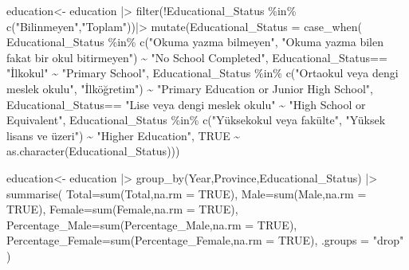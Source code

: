 \documentclass[
  11pt,
  a4paper,
  DIV=11,
  numbers=noendperiod]{scrartcl}
\newenvironment{Shaded}{\begin{snugshade}}{\end{snugshade}}
\newcommand{\AttributeTok}[1]{\textcolor[rgb]{0.40,0.45,0.13}{#1}}
\newcommand{\ConstantTok}[1]{\textcolor[rgb]{0.56,0.35,0.01}{#1}}
\newcommand{\FunctionTok}[1]{\textcolor[rgb]{0.28,0.35,0.67}{#1}}
\newcommand{\NormalTok}[1]{\textcolor[rgb]{0.00,0.23,0.31}{#1}}
\newcommand{\OtherTok}[1]{\textcolor[rgb]{0.00,0.23,0.31}{#1}}
\newcommand{\SpecialCharTok}[1]{\textcolor[rgb]{0.37,0.37,0.37}{#1}}
\newcommand{\StringTok}[1]{\textcolor[rgb]{0.13,0.47,0.30}{#1}}
\begin{document}
\begin{Shaded}
\begin{Highlighting}[]
\NormalTok{ education}\OtherTok{\textless{}{-}}\NormalTok{ education }\SpecialCharTok{|\textgreater{}} \FunctionTok{filter}\NormalTok{(}\SpecialCharTok{!}\NormalTok{Educational\_Status }\SpecialCharTok{\%in\%} \FunctionTok{c}\NormalTok{(}\StringTok{"Bilinmeyen"}\NormalTok{,}\StringTok{"Toplam"}\NormalTok{))}\SpecialCharTok{|\textgreater{}}
  \FunctionTok{mutate}\NormalTok{(}\AttributeTok{Educational\_Status =} \FunctionTok{case\_when}\NormalTok{(}
\NormalTok{    Educational\_Status }\SpecialCharTok{\%in\%} \FunctionTok{c}\NormalTok{(}\StringTok{"Okuma yazma bilmeyen"}\NormalTok{, }\StringTok{"Okuma yazma bilen fakat bir okul bitirmeyen"}\NormalTok{) }\SpecialCharTok{\textasciitilde{}} \StringTok{"No School Completed"}\NormalTok{,}
\NormalTok{    Educational\_Status}\SpecialCharTok{==} \StringTok{"İlkokul"} \SpecialCharTok{\textasciitilde{}} \StringTok{"Primary School"}\NormalTok{,}
\NormalTok{    Educational\_Status }\SpecialCharTok{\%in\%} \FunctionTok{c}\NormalTok{(}\StringTok{"Ortaokul veya dengi meslek okulu"}\NormalTok{, }\StringTok{"İlköğretim"}\NormalTok{) }\SpecialCharTok{\textasciitilde{}} \StringTok{"Primary Education or Junior High School"}\NormalTok{,}
\NormalTok{    Educational\_Status}\SpecialCharTok{==} \StringTok{"Lise veya dengi meslek okulu"} \SpecialCharTok{\textasciitilde{}} \StringTok{"High School or Equivalent"}\NormalTok{,}
\NormalTok{    Educational\_Status }\SpecialCharTok{\%in\%} \FunctionTok{c}\NormalTok{(}\StringTok{"Yüksekokul veya fakülte"}\NormalTok{, }\StringTok{"Yüksek lisans ve üzeri"}\NormalTok{) }\SpecialCharTok{\textasciitilde{}} \StringTok{"Higher Education"}\NormalTok{,}
    \ConstantTok{TRUE} \SpecialCharTok{\textasciitilde{}} \FunctionTok{as.character}\NormalTok{(Educational\_Status))) }
  
\NormalTok{  education}\OtherTok{\textless{}{-}}\NormalTok{ education }\SpecialCharTok{|\textgreater{}}  \FunctionTok{group\_by}\NormalTok{(Year,Province,Educational\_Status) }\SpecialCharTok{|\textgreater{}}
  \FunctionTok{summarise}\NormalTok{(}
    \AttributeTok{Total=}\FunctionTok{sum}\NormalTok{(Total,}\AttributeTok{na.rm =} \ConstantTok{TRUE}\NormalTok{),}
    \AttributeTok{Male=}\FunctionTok{sum}\NormalTok{(Male,}\AttributeTok{na.rm =} \ConstantTok{TRUE}\NormalTok{),}
    \AttributeTok{Female=}\FunctionTok{sum}\NormalTok{(Female,}\AttributeTok{na.rm =} \ConstantTok{TRUE}\NormalTok{),}
    \AttributeTok{Percentage\_Male=}\FunctionTok{sum}\NormalTok{(Percentage\_Male,}\AttributeTok{na.rm =} \ConstantTok{TRUE}\NormalTok{),}
    \AttributeTok{Percentage\_Female=}\FunctionTok{sum}\NormalTok{(Percentage\_Female,}\AttributeTok{na.rm =} \ConstantTok{TRUE}\NormalTok{),}
    \AttributeTok{.groups =} \StringTok{"drop"}
\NormalTok{  )}
  

\end{Highlighting}
\end{Shaded}
\end{document}
